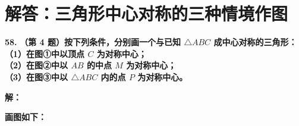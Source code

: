 \documentclass[12pt, a4paper]{ctexrep}
\begin{document}
\newpage

\section{解答：三角形中心对称的三种情境作图}

\vspace{0.6cm}

\textbf{\LARGE 58.} \textbf{（第 4 题）按下列条件，分别画一个与已知 $\triangle ABC$ 成中心对称的三角形：\\
（1）在图①中以顶点 $C$ 为对称中心；\\
（2）在图②中以 $AB$ 的中点 $M$ 为对称中心；\\
（3）在图③中以 $\triangle ABC$ 内的点 $P$ 为对称中心。}

\vspace{0.4cm}
\textbf{解：}

\textbf{画图如下：}
\end{document}
